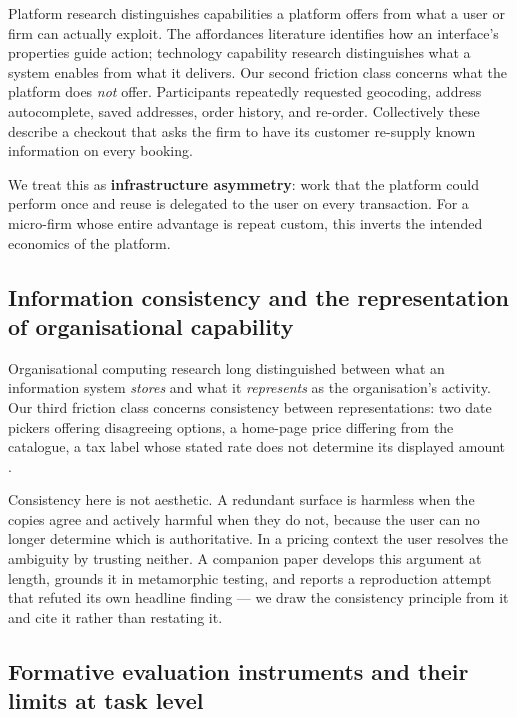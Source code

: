 \documentclass[]{interact}
\theoremstyle{plain}
\begin{document}
Platform research distinguishes capabilities a platform offers from what a user or firm can actually
exploit. The affordances literature \citep{norman2013} identifies how an interface's properties guide
action; technology capability research \citep{tbdPlatformCapability} distinguishes what a system enables
from what it delivers. Our second friction class concerns what the platform does \emph{not} offer.
Participants repeatedly requested geocoding, address autocomplete, saved addresses, order history, and
re-order. Collectively these describe a checkout that asks the firm to have its customer re-supply known
information on every booking.

We treat this as \textbf{infrastructure asymmetry}: work that the platform could perform once and reuse
is delegated to the user on every transaction. For a micro-firm whose entire advantage is repeat
custom, this inverts the intended economics of the platform.

\subsection{Information consistency and the representation of organisational capability}

Organisational computing research long distinguished between what an information system
\emph{stores} and what it \emph{represents} as the organisation's activity. Our third friction class
concerns consistency between representations: two date pickers offering disagreeing options, a
home-page price differing from the catalogue, a tax label whose stated rate does not determine its
displayed amount \citep{braniwati2026price}.

Consistency here is not aesthetic. A redundant surface is harmless when the copies agree and actively
harmful when they do not, because the user can no longer determine which is authoritative. In a
pricing context the user resolves the ambiguity by trusting neither. A companion paper
\citep{braniwati2026price} develops this argument at length, grounds it in metamorphic testing, and
reports a reproduction attempt that refuted its own headline finding --- we draw the consistency
principle from it and cite it rather than restating it.

\subsection{Formative evaluation instruments and their limits at task level}
\end{document}
